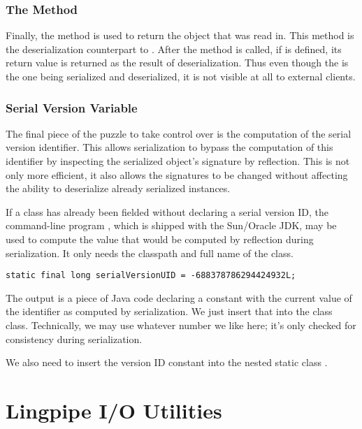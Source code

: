 \subsubsection{The  Method}

Finally, the  method is used to return the object
that was read in.  This method is the deserialization counterpart to
.  After the  method is
called, if  is defined, its return value is
returned as the result of deserialization.  Thus even though
the  is the one being serialized and deserialized,
it is not visible at all to external clients.

\subsubsection{Serial Version Variable}

The final piece of the puzzle to take control over is the computation
of the serial version identifier.  This allows serialization to
bypass the computation of this identifier by inspecting the serialized
object's signature by reflection.  This is not only more efficient,
it also allows the signatures to be changed without affecting
the ability to deserialize already serialized instances.

If a class has already been fielded without declaring a serial version
ID, the command-line program , which is shipped with
the Sun/Oracle JDK, may be used to compute the value that would be
computed by reflection during serialization.  It only needs the
classpath and full name of the class.
%
\begin{verbatim}
static final long serialVersionUID = -688378786294424932L;
\end{verbatim}
%
The output is a piece of Java code declaring a constant
 with the current value of the identifier as
computed by serialization.  We just insert that into the class
 class.  Technically, we may use whatever number
we like here; it's only checked for consistency during serialization.

We also need to insert the version ID constant into the nested static
class .


\section{Lingpipe I/O Utilities}

